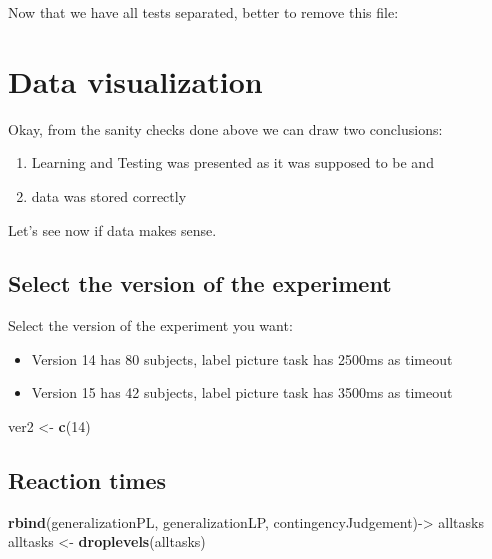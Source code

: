 \documentclass[
]{article}
\newenvironment{Shaded}{\begin{snugshade}}{\end{snugshade}}
\newcommand{\DecValTok}[1]{\textcolor[rgb]{0.00,0.00,0.81}{#1}}
\newcommand{\KeywordTok}[1]{\textcolor[rgb]{0.13,0.29,0.53}{\textbf{#1}}}
\newcommand{\NormalTok}[1]{#1}
\newcommand{\StringTok}[1]{\textcolor[rgb]{0.31,0.60,0.02}{#1}}
\begin{document}
Now that we have all tests separated, better to remove this file:

\hypertarget{data-visualization}{%
\section{Data visualization}\label{data-visualization}}

Okay, from the sanity checks done above we can draw two conclusions:

\begin{enumerate}
\def\labelenumi{\arabic{enumi}.}
\item
  Learning and Testing was presented as it was supposed to be and
\item
  data was stored correctly
\end{enumerate}

Let's see now if data makes sense.

\hypertarget{select-the-version-of-the-experiment}{%
\subsection{Select the version of the
experiment}\label{select-the-version-of-the-experiment}}

Select the version of the experiment you want:

\begin{itemize}
\item
  Version 14 has 80 subjects, label picture task has 2500ms as timeout
\item
  Version 15 has 42 subjects, label picture task has 3500ms as timeout
\end{itemize}

\begin{Shaded}
\begin{Highlighting}[]
\NormalTok{ver2 <-}\StringTok{ }\KeywordTok{c}\NormalTok{(}\DecValTok{14}\NormalTok{)}
\end{Highlighting}
\end{Shaded}

\hypertarget{reaction-times}{%
\subsection{Reaction times}\label{reaction-times}}

\begin{Shaded}
\begin{Highlighting}[]
\KeywordTok{rbind}\NormalTok{(generalizationPL, generalizationLP, contingencyJudgement)->}\StringTok{ }\NormalTok{alltasks}
\NormalTok{alltasks <-}\StringTok{ }\KeywordTok{droplevels}\NormalTok{(alltasks)}
\end{Highlighting}
\end{Shaded}
\end{document}
